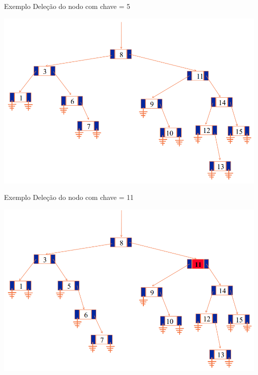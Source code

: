 \documentclass[12pt,table,xcolor={dvipsnames}]{beamer}
\begin{document}
\begin{frame}[fragile]{Exemplo}
	Deleção do nodo com chave = 5
	\begin{center}
		\includegraphics[scale=.3]{arv12.png} 
	\end{center}
\end{frame}

\begin{frame}[fragile]{Exemplo}
Deleção do nodo com chave = 11
\begin{center}
\includegraphics[scale=.3]{arv13.png} 
\end{center}
\end{frame}
\end{document}
